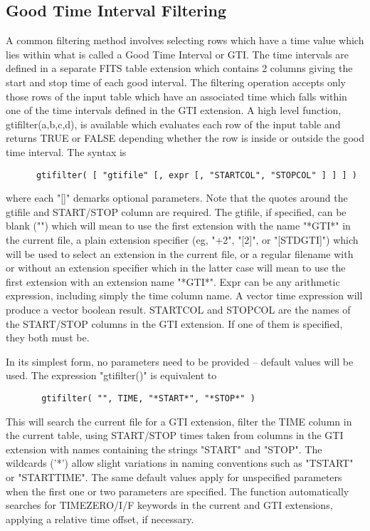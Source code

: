 \documentclass[11pt]{book}
\begin{document}
\subsection{Good Time Interval Filtering}

    A common filtering method involves selecting rows which have a time
    value which lies within what is called a Good Time Interval or GTI.
    The time intervals are defined in a separate FITS table extension
    which contains 2 columns giving the start and stop time of each
    good interval.  The filtering operation accepts only those rows of
    the input table which have an associated time which falls within
    one of the time intervals defined in the GTI extension. A high
    level function, gtifilter(a,b,c,d), is available which evaluates
    each row of the input table  and returns TRUE  or FALSE depending
    whether the row is inside or outside the  good time interval.  The
    syntax is

\begin{verbatim}
      gtifilter( [ "gtifile" [, expr [, "STARTCOL", "STOPCOL" ] ] ] )
\end{verbatim}
    where  each "[]" demarks optional parameters.  Note that  the quotes
    around the gtifile and START/STOP column are required.  The gtifile,
    if specified,  can be blank  ("") which will  mean to use  the first
    extension  with   the name "*GTI*"  in   the current  file,  a plain
    extension  specifier (eg, "+2",  "[2]", or "[STDGTI]") which will be
    used  to  select  an extension  in  the current  file, or  a regular
    filename with or without an extension  specifier which in the latter
    case  will mean to  use the first  extension  with an extension name
    "*GTI*".  Expr can be   any arithmetic expression, including  simply
    the time  column  name.  A  vector  time expression  will  produce a
    vector boolean  result.  STARTCOL and  STOPCOL are the  names of the
    START/STOP   columns in the    GTI extension.  If   one  of them  is
    specified, they both  must be.

    In  its  simplest form, no parameters need to be provided -- default
    values will be used.  The expression "gtifilter()" is equivalent to

\begin{verbatim}
       gtifilter( "", TIME, "*START*", "*STOP*" )
\end{verbatim}
    This will search the current file for a GTI  extension,  filter  the
    TIME  column in the current table, using START/STOP times taken from
    columns in the GTI  extension  with  names  containing  the  strings
    "START"  and "STOP".  The wildcards ('*') allow slight variations in
    naming conventions  such  as  "TSTART"  or  "STARTTIME".   The  same
    default  values  apply for unspecified parameters when the first one
    or  two  parameters  are  specified.   The  function   automatically
    searches   for   TIMEZERO/I/F   keywords  in  the  current  and  GTI
    extensions, applying a relative time offset, if necessary.
\end{document}
